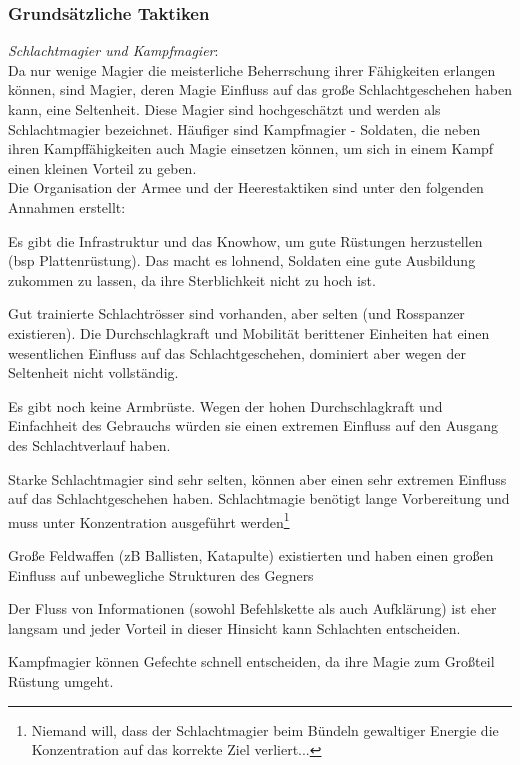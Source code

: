 \subsubsection{Grundsätzliche Taktiken}
\emph{Schlachtmagier und Kampfmagier}:\\
Da nur wenige Magier die meisterliche Beherrschung ihrer Fähigkeiten erlangen können, sind Magier, deren Magie Einfluss auf das große Schlachtgeschehen haben kann, eine Seltenheit. 
Diese Magier sind hochgeschätzt und werden als Schlachtmagier bezeichnet. 
Häufiger sind Kampfmagier - Soldaten, die neben ihren Kampffähigkeiten auch Magie einsetzen können, um sich in einem Kampf einen kleinen Vorteil zu geben. \\
Die Organisation der Armee und der Heerestaktiken sind unter den folgenden Annahmen erstellt:
\begin{outline}
	\item Es gibt die Infrastruktur und das Knowhow, um gute Rüstungen herzustellen (bsp Plattenrüstung). 
		Das macht es lohnend, Soldaten eine gute Ausbildung zukommen zu lassen, da ihre Sterblichkeit nicht zu hoch ist.
	\item Gut trainierte Schlachtrösser sind vorhanden, aber selten (und Rosspanzer existieren). 
		Die Durchschlagkraft und Mobilität berittener Einheiten hat einen wesentlichen Einfluss auf das Schlachtgeschehen, dominiert aber wegen der Seltenheit nicht vollständig.
	\item Es gibt noch keine Armbrüste. Wegen der hohen Durchschlagkraft und Einfachheit des Gebrauchs würden sie einen extremen Einfluss auf den Ausgang des Schlachtverlauf haben.
	\item Starke Schlachtmagier sind sehr selten, können aber einen sehr extremen Einfluss auf das Schlachtgeschehen haben. 
		Schlachtmagie benötigt lange Vorbereitung und muss unter Konzentration ausgeführt werden\footnote{Niemand will, dass der Schlachtmagier beim Bündeln gewaltiger Energie die Konzentration auf das korrekte Ziel verliert...}
	\item Große Feldwaffen (zB Ballisten, Katapulte) existierten und haben einen großen Einfluss auf unbewegliche Strukturen des Gegners
	\item Der Fluss von Informationen (sowohl Befehlskette als auch Aufklärung) ist eher langsam und jeder Vorteil in dieser Hinsicht kann Schlachten entscheiden.
	\item Kampfmagier können Gefechte schnell entscheiden, da ihre Magie zum Großteil Rüstung umgeht. 
\end{outline}
